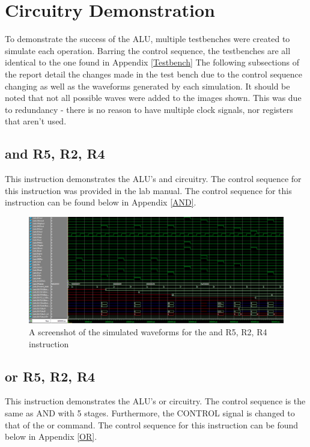 \documentclass{article}
\begin{document}
\section{Circuitry Demonstration}

    To demonstrate the success of the ALU, multiple testbenches were created to simulate each operation. Barring the control sequence, the testbenches are all identical to the one found in Appendix \ref{Testbench} The following subsections of the report detail the changes made in the test bench due to the control sequence changing as well as the waveforms generated by each simulation. It should be noted that not all possible waves were added to the images shown. This was due to redundancy - there is no reason to have multiple clock signals, nor registers that aren't used.

    \subsection{and R5, R2, R4}
    This instruction demonstrates the ALU's and circuitry. The control sequence for this instruction was provided in the lab manual. The control sequence for this instruction can be found below in Appendix \ref{AND}.
    
    \begin{figure}[h!]
        \begin{center}
            \includegraphics[width=15cm]{AND_FINAL.png}
            \caption{A screenshot of the simulated waveforms for the and R5, R2, R4 instruction}
        \end{center}
    \end{figure}

    \subsection{or R5, R2, R4}
     This instruction demonstrates the ALU's or circuitry. The control sequence is the same as AND with 5 stages. Furthermore, the CONTROL signal is changed to that of the or command. The control sequence for this instruction can be found below in Appendix \ref{OR}.
     
\end{document}
